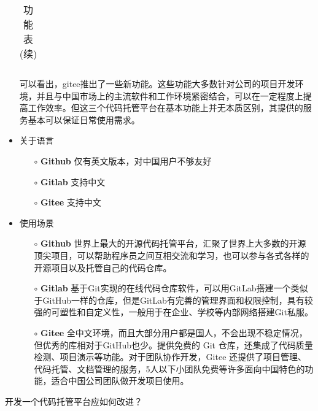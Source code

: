 \documentclass{homework}
\begin{document}
\begin{itemize}
\begin{table}[!htbp]
\begin{tabular}{ccccccccccc}
				\bottomrule
			\end{tabular}
			\caption{功能表(续)}
		\end{table}
		\par 可以看出，gitee推出了一些新功能。这些功能大多数针对公司的项目开发环境，并且与中国市场上的主流软件和工作环境紧密结合，可以在一定程度上提高工作效率。但这三个代码托管平台在基本功能上并无本质区别，其提供的服务基本可以保证日常使用需求。
	\item 关于语言
		\begin{itemize}
			\item[$\circ$] \textbf{Github} 仅有英文版本，对中国用户不够友好
			\item[$\circ$] \textbf{Gitlab} 支持中文
			\item[$\circ$] \textbf{Gitee} 支持中文 
		\end{itemize}
	\item 使用场景
		\begin{itemize}
			\item[$\circ$] \textbf{Github} 世界上最大的开源代码托管平台，汇聚了世界上大多数的开源顶尖项目，可以帮助程序员之间互相交流和学习，也可以参与各式各样的开源项目以及托管自己的代码仓库。
			\item[$\circ$] \textbf{Gitlab} 基于Git实现的在线代码仓库软件，可以用GitLab搭建一个类似于GitHub一样的仓库，但是GitLab有完善的管理界面和权限控制，具有较强的可塑性和自定义性，一般用于在企业、学校等内部网络搭建Git私服。
			\item[$\circ$] \textbf{Gitee} 全中文环境，而且大部分用户都是国人，不会出现不稳定情况，但优秀的库相对于GitHub也少。提供免费的 Git 仓库，还集成了代码质量检测、项目演示等功能。对于团队协作开发，Gitee 还提供了项目管理、代码托管、文档管理的服务，5人以下小团队免费等许多面向中国特色的功能，适合中国公司团队做开发项目使用。
		\end{itemize}
\end{itemize}


\question \large{开发一个代码托管平台应如何改进？}
\end{document}
